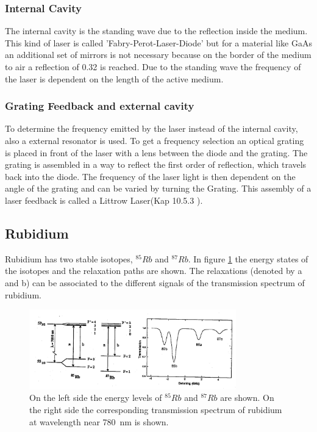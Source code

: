 \subsubsection{Internal Cavity}
The internal cavity is the standing wave due to the reflection inside the medium.
This kind of laser is called 'Fabry-Perot-Laser-Diode' but for a material like GaAs an additional set of mirrors is not necessary because on the border of the medium to air a reflection of \num{0.32} is reached.
Due to the standing wave the frequency of the laser is dependent on the length of the active medium. 
\subsubsection{Grating Feedback and external cavity}
\label{sec:grating}
To determine the frequency emitted by the laser instead of the internal cavity, also a external resonator is used.
To get a frequency selection an optical grating is placed in front of the laser with a lens between the diode and the grating.
The grating is assembled in a way to reflect the first order of reflection, which travels back into the diode.
The frequency of the laser light is then dependent on the angle of the grating and can be varied by turning the Grating.
This assembly of a laser feedback is called a Littrow Laser(Kap 10.5.3 \cite{eichler_laser}).
\subsection{Rubidium}
Rubidium has two stable isotopes, $^{85}Rb$ and $^{87}Rb$.
In figure \ref{fig:rubidium} the energy states of the isotopes and the relaxation paths are shown.
The relaxations (denoted by a and b) can be associated to the different signals of the transmission spectrum of rubidium.
\cite{rubidium}
\begin{figure}
    \center
    \includegraphics[width=0.8\textwidth]{bilder/Rubidium_Energy.png}
    \caption{On the left side the energy levels of $^{85}Rb$ and $^{87}Rb$ are shown. On the right side the corresponding transmission spectrum of rubidium at wavelength near \SI{780}{\nano \metre} is shown. \cite{anleitung}}
    \label{fig:rubidium}
\end{figure}